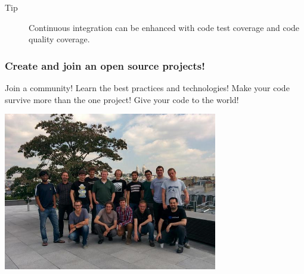 \documentclass[11pt,compress,serif]{beamer}
\begin{document}
\begin{frame}
{         \begin{description}    
             \item[Tip] Continuous integration can be enhanced with code test coverage and code quality coverage. 
         \end{description}          
       
    }


\end{frame}

\begin{frame}[fragile=singleslide]
\frametitle{Create and join an open source projects!}

Join a community! Learn the best practices and technologies! 
Make your code survive more than the one project! Give your
code to the world!

\begin{center}
\includegraphics[width=0.7\textwidth]{scikit-learn-sprint.jpg}

\begin{small}
\end{small}
\end{center}

    
\end{frame}
\end{document}
